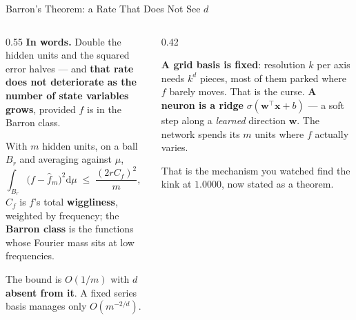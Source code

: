 \begin{frame}{Barron's Theorem: a Rate That Does Not See $d$}
\begin{columns}[T]
\begin{column}{0.55\textwidth}
\footnotesize
\textbf{In words.} Double the hidden units and the squared error halves --- and \textbf{that rate does not deteriorate as the number of state variables grows}, provided $f$ is in the Barron class.
\smallskip
\begin{conceptbox}[title=\textbf{Barron (1993), Proposition 1}]\footnotesize
With $m$ hidden units, on a ball $B_r$ and averaging against $\mu$,
\[
  \int_{B_r}\bigl(f-\hat f_m\bigr)^{2}\mathrm{d}\mu\;\le\;\frac{(2rC_f)^{2}}{m},
  \qquad C_f=\!\int\!\lVert\boldsymbol\omega\rVert\,|\hat f(\boldsymbol\omega)|\,\mathrm{d}\boldsymbol\omega .
\]
$C_f$ is $f$'s total \textbf{wiggliness}, weighted by frequency; the \textbf{Barron class} is the functions whose Fourier mass sits at low frequencies.
\end{conceptbox}
\smallskip
\small
The bound is $O(1/m)$ with $d$ \textbf{absent from it}. A fixed series basis manages only $O(m^{-2/d})$.
\end{column}
\begin{column}{0.42\textwidth}
\begin{takeawaybox}[title=\textbf{Why the difference}]\small
\textbf{A grid basis is fixed}: resolution $k$ per axis needs $k^{d}$ pieces, most of them parked where $f$ barely moves. That is the curse.
\medskip
\textbf{A neuron is a ridge} $\sigma(\mathbf{w}^{\top}\mathbf{x}+b)$ --- a soft step along a \emph{learned} direction $\mathbf{w}$. The network spends its $m$ units where $f$ actually varies.
\end{takeawaybox}
\medskip
{\footnotesize That is the mechanism you watched find the kink at $1.0000$, now stated as a theorem.}
\end{column}
\end{columns}
\vspace{1mm}
\end{frame}

